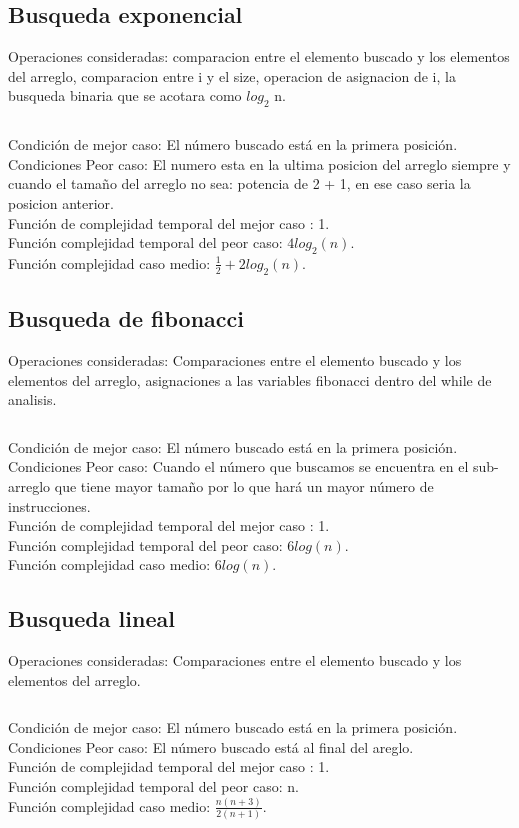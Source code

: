 \documentclass[12pt]{report}
\begin{document}
\subsection*{Busqueda exponencial}
Operaciones consideradas: comparacion entre el elemento buscado y los elementos del arreglo, comparacion entre i y el size, operacion de asignacion de i, la busqueda binaria que se acotara como $log_2$ n.\\
\inputminted[firstline = 32, lastline = 40]{C}{bexponencial.c}
Condición de mejor caso: El número buscado está en la primera posición. \\
Condiciones Peor caso: El numero esta en la ultima posicion del arreglo siempre y cuando el tamaño del arreglo no sea: potencia de 2 + 1, en ese caso seria la posicion anterior. \\
Función de complejidad temporal del mejor caso : 1.\\
Función complejidad temporal del peor caso: $4log_2(n)$. \\
Función complejidad caso medio: $\frac{1}{2}+2log_2(n)$.\\
\newpage
\subsection*{Busqueda de fibonacci}
Operaciones consideradas: Comparaciones entre el elemento buscado y los elementos del arreglo, asignaciones a las variables fibonacci dentro del while de analisis.
\inputminted[firstline = 55, lastline = 100]{C}{bfibonacci.c}
Condición de mejor caso: El número buscado está en la primera posición. \\
Condiciones Peor caso: Cuando el número que buscamos se encuentra en el sub-arreglo que tiene mayor tamaño por lo que hará un mayor número de instrucciones. \\
Función de complejidad temporal del mejor caso : 1.\\
Función complejidad temporal del peor caso: $6log(n)$. \\
Función complejidad caso medio: $6log(n)$.
\newpage
\subsection*{Busqueda lineal}
Operaciones consideradas: Comparaciones entre el elemento buscado y los elementos del arreglo.\\
\inputminted[firstline = 15, lastline = 22]{C}{blineal.c}
Condición de mejor caso: El número buscado está en la primera posición. \\
Condiciones Peor caso: El número buscado está al final del areglo. \\
Función de complejidad temporal del mejor caso : 1. \\
Función complejidad temporal del peor caso: n. \\
Función complejidad caso medio: $\frac{n(n+3)}{2(n+1)}$.\\
\end{document}
